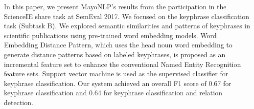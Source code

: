 In this paper, we present MayoNLP's results from the participation in the ScienceIE share task at SemEval 2017. We focused on the keyphrase classification task (Subtask B). We explored semantic similarities and patterns of keyphrases in scientific publications using pre-trained word embedding models. Word Embedding Distance Pattern, which uses the head noun word embedding to generate distance patterns based on labeled keyphrases, is proposed as an incremental feature set to enhance the conventional Named Entity Recognition feature sets.  Support vector machine is used as the supervised classifier for keyphrase classification. Our system achieved an overall F1 score of 0.67 for keyphrase classification and 0.64 for keyphrase classification and relation detection.
